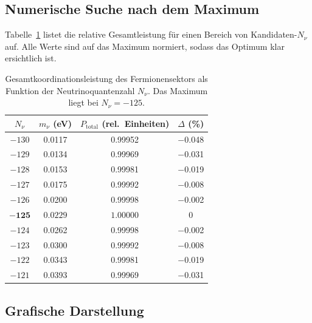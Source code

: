 \documentclass[12pt,a4paper]{article}
\begin{document}
	\subsection{Numerische Suche nach dem Maximum}
	
	Tabelle~\ref{tab:power} listet die relative Gesamtleistung für einen Bereich von Kandidaten-\(N_{\nu}\) auf.  Alle Werte sind auf das Maximum normiert, sodass das Optimum klar ersichtlich ist.
	
	\begin{table}[htbp]
		\centering
		\caption{Gesamtkoordinationsleistung des Fermionensektors als Funktion der Neutrinoquantenzahl \(N_{\nu}\).  Das Maximum liegt bei \(N_{\nu}=-125\).}
		\label{tab:power}
		\small
		\begin{tabular}{c c c c}
			\toprule
			\(N_{\nu}\) & \(m_{\nu}\) (eV) & \(P_{\mathrm{total}}\) (rel.\ Einheiten) & \(\Delta\) (\%) \\
			\midrule
			\(-130\) & 0.0117 & 0.99952 & $-$0.048 \\
			\(-129\) & 0.0134 & 0.99969 & $-$0.031 \\
			\(-128\) & 0.0153 & 0.99981 & $-$0.019 \\
			\(-127\) & 0.0175 & 0.99992 & $-$0.008 \\
			\(-126\) & 0.0200 & 0.99998 & $-$0.002 \\
			$\mathbf{-125}$ & $\mathbf{0.0229}$ & $\mathbf{1.00000}$ & 0 \\
			\(-124\) & 0.0262 & 0.99998 & $-$0.002 \\
			\(-123\) & 0.0300 & 0.99992 & $-$0.008 \\
			\(-122\) & 0.0343 & 0.99981 & $-$0.019 \\
			\(-121\) & 0.0393 & 0.99969 & $-$0.031 \\
			\bottomrule
		\end{tabular}
	\end{table}
	
	\subsection{Grafische Darstellung}
	
\end{document}
